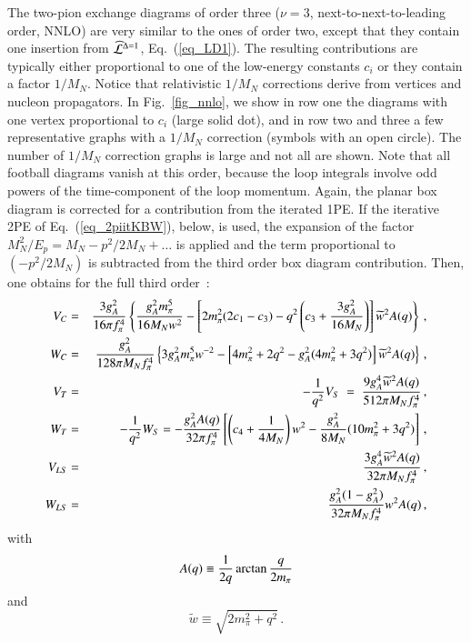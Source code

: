 \documentclass[sort&compress,preprint,3p]{elsarticle}
\begin{document}
The two-pion exchange diagrams of order three ($\nu=3$, 
next-to-next-to-leading order,
NNLO) are very similar to the ones of order two, except that 
they contain one insertion from 
$\widehat{\cal L}^{\Delta=1}$,
Eq.~(\protect\ref{eq_LD1}).
The resulting contributions are typically either 
proportional to one of the 
low-energy constants $c_i$ or they contain a factor $1/M_N$.
Notice that relativistic $1/M_N$ corrections derive
from vertices and nucleon propagators.
In Fig.~\ref{fig_nnlo}, we show in row one the diagrams with
one vertex proportional to $c_i$ (large solid dot), 
and in row two and three a few representative graphs with a $1/M_N$ 
correction (symbols with an open circle). The number 
of $1/M_N$ correction graphs
is large and not all are shown.
Note that all football diagrams vanish at this order,
because the loop integrals involve odd powers of the time-component
of the loop momentum.
Again, the planar box diagram is corrected for a contribution from
the iterated 1PE. If the iterative 2PE of 
Eq.~(\ref{eq_2piitKBW}), below, is used, the expansion of
the factor 
$M^2_N/E_p = M_N - p^2/2M_N + \ldots$ 
is applied and
the term proportional to $(-p^2/2M_N)$ is subtracted from
the third order box diagram contribution.
Then, one obtains for the full third order~\cite{KBW97}:
\begin{eqnarray} 
V_C &=&{3g_A^2 \over 16\pi f_\pi^4} 
\left\{ 
 {g_A^2 m_\pi^5  \over 16M_N w^2}  
-\left[2m_\pi^2( 2c_1-c_3)-q^2  \left(c_3 +{3g_A^2\over16M_N}\right)
\right]
\widetilde{w}^2 A(q) \right\} \,, 
\label{eq_3C}
\\
W_C &=& {g_A^2\over128\pi M_N f_\pi^4} \left\{ 
 3g_A^2 m_\pi^5 w^{-2} 
 - \left[ 4m_\pi^2 +2q^2-g_A^2(4m_\pi^2+3q^2) \right] 
\widetilde{w}^2 A(q)
\right\} 
\,,\\ 
V_T &=& -{1 \over q^2} V_{S}
   \; = \; {9g_A^4 \widetilde{w}^2 A(q) \over 512\pi M_N f_\pi^4} 
 \,,  \\ 
W_T &=&-{1\over q^2}W_{S} 
    =-{g_A^2 A(q) \over 32\pi f_\pi^4}
\left[
\left( c_4 +{1\over 4M_N} \right) w^2
-{g_A^2 \over 8M_N} (10m_\pi^2+3q^2)  \right] 
\,,
\label{eq_3T}
\\
V_{LS} &=&  {3g_A^4  \widetilde{w}^2 A(q) \over 32\pi M_N f_\pi^4} 
 \,,\\  
W_{LS} &=& {g_A^2(1-g_A^2)\over 32\pi M_N f_\pi^4} 
w^2 A(q) \,, 
\label{eq_3LS}
\end{eqnarray}   
with
\begin{equation} 
A(q) \equiv {1\over 2q}\arctan{q \over 2m_\pi} 
\end{equation}
and
\begin{equation} 
\widetilde{w} \equiv  \sqrt{2m_\pi^2+q^2} \,. 
\end{equation}
\end{document}
